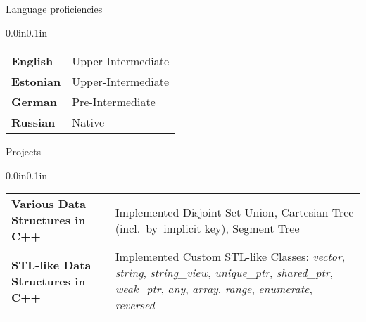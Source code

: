 \documentclass{resume} %
\makeatletter
\newcommand{\entry}[2]{#1 & #2 \tabularnewline} %
\newcommand{\tableEnv}[2]{%
  \begin{rSection}{#1} %
    \begin{adjustwidth}{0.0in}{0.1in} %
      \begin{tabularx}{\linewidth}{@{} >{\bfseries}l @{\hspace{6ex}} X @{}}
        #2 %
      \end{tabularx}
    \end{adjustwidth}
  \end{rSection}
}
\makeatother
\begin{document}
\tableEnv{Language proficiencies}{
    \entry{English}{Upper-Intermediate}
    \entry{Estonian}{Upper-Intermediate}
    \entry{German}{Pre-Intermediate}
    \entry{Russian}{Native}
}


\tableEnv{Projects}{
    \entry{Various Data Structures in C++}{Implemented Disjoint Set Union, Cartesian Tree (incl.~by~implicit key), Segment Tree}
    
    \entry{STL-like Data Structures in C++}{Implemented Custom STL-like Classes: \textit{vector}, \textit{string}, \textit{string\_view}, \textit{unique\_ptr}, \textit{shared\_ptr}, \textit{weak\_ptr}, \textit{any}, \textit{array}, \textit{range}, \textit{enumerate}, \textit{reversed}}
    
}

\end{document}
